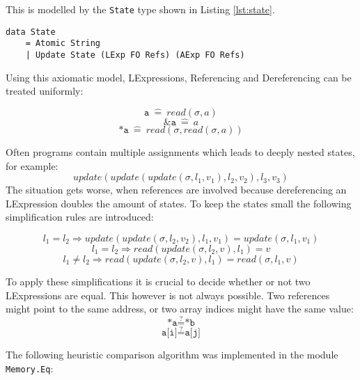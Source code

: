 \documentclass[12pt]{article}
\begin{document}
This is modelled by the \texttt{State} type shown in Listing \ref{lst:state}.

\begin{lstlisting}[style=c0, caption=State, label=lst:state]
data State
    = Atomic String
    | Update State (LExp FO Refs) (AExp FO Refs)
\end{lstlisting}

Using this axiomatic model, LExpressions, Referencing and Dereferencing can be treated uniformly:

\[ \texttt{a}\ \hat{=}\ read(\sigma, a) \]
\[ \texttt{\&a}\ \hat{=}\ a \]
\[ \texttt{*a}\ \hat{=}\ read(\sigma, read(\sigma, a))\]

Often programs contain multiple assignments which leads to deeply nested states, for example:
\[ update(update(update(\sigma, l_1, v_1), l_2, v_2), l_3, v_3) \]
The situation gets worse, when references are involved because dereferencing an LExpression doubles the amount of states. 
To keep the states small the following simplification rules are introduced:

\[ l_1 = l_2 \Rightarrow update(update(\sigma, l_2 , v_2), l_1, v_1) = update(\sigma, l_1 , v_1)\]
\[ l_1 = l_2 \Rightarrow read(update(\sigma, l_2 , v), l_1) = v \]
\[ l_1 \neq l_2 \Rightarrow read(update(\sigma, l_2 , v), l_1) = read(\sigma, l_1 , v) \]

To apply these simplifications it is crucial to decide whether or not two LExpressions are equal.
This however is not always possible.
Two references might point to the same address, or two array indices might have the same value:
\[ \texttt{*a} \stackrel{?}{=} \texttt{*b} \]
\[ \texttt{a[i]} \stackrel{?}{=} \texttt{a[j]} \]

The following heuristic comparison algorithm was implemented in the module \texttt{Memory.Eq}:
\end{document}

